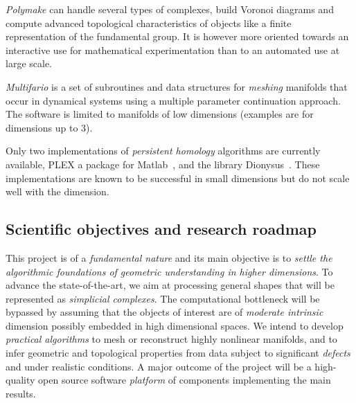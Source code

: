 {\em Polymake} can handle several types of complexes, build Voronoi diagrams and compute advanced topological characteristics of objects like a finite representation of the fundamental group. It is however more oriented towards an interactive use for mathematical experimentation 
than to an automated use at large scale.%

{\em Multifario} is a set of subroutines and data structures for {\em meshing} manifolds that occur in dynamical systems using a multiple parameter continuation approach. The software is limited to manifolds of low dimensions (examples are for dimensions up to 3). 

Only two implementations of {\em persistent homology} algorithms are currently available, PLEX a package for Matlab~\cite{}, and  the library Dionysus~\cite{}. These implementations are known to be successful in small dimensions but do not scale well with the dimension. %

\subsection{Scientific objectives and research roadmap} 

This project is of a {\em fundamental nature} and its main objective is to {\em settle the algorithmic foundations of geometric understanding in higher dimensions}. To advance the state-of-the-art, we aim at processing general shapes that will be represented as {\em simplicial complexes}. The computational bottleneck will be bypassed by assuming that the objects of interest are of {\em moderate intrinsic} dimension possibly embedded in high dimensional spaces. We intend to develop {\em practical algorithms} to mesh or reconstruct highly nonlinear manifolds, and to infer geometric and topological properties from data subject to significant {\em defects} and
 under realistic conditions. A major outcome of the project will be a high-quality open source software {\em platform} of components implementing the main results.

